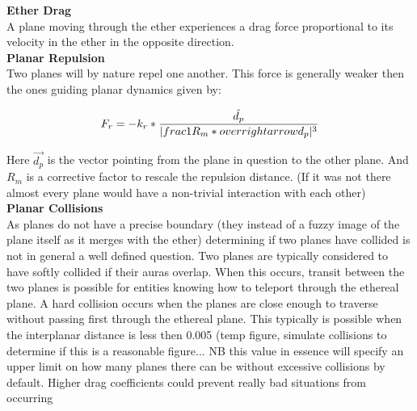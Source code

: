\documentclass[10pt]{article}
\begin{document}
\noindent\textbf{Ether Drag}\\
A plane moving through the ether experiences a drag force proportional to its velocity in the ether in the opposite direction.\\

\noindent\textbf{Planar Repulsion}\\
Two planes will by nature repel one another. This force is generally weaker then the ones guiding planar dynamics given by:

\[
F_r = -k_r*\frac{\hat{d_p}}{\vert\\frac{1}{R_m}*overrightarrow{d_p}\vert^3}
\]

Here $\overrightarrow{d_p}$ is the vector pointing from the plane in question to the other plane. And $R_m$ is a corrective factor to rescale the repulsion distance. (If it was not there almost every plane would have a non-trivial interaction with each other)\\

\noindent\textbf{Planar Collisions}\\
As planes do not have a precise boundary (they instead of a fuzzy image of the plane itself as it merges with the ether) determining if two planes have collided is not in general a well defined question. Two planes are typically considered to have softly collided if their auras overlap. When this occurs, transit between the two planes is possible for entities knowing how to teleport through the ethereal plane. A hard collision occurs when the planes are close enough to traverse without passing first through the ethereal plane. This typically is possible when the interplanar distance is less then 0.005 (temp figure, simulate collisions to determine if this is a reasonable figure... NB this value in essence will specify an upper limit on how many planes there can be without excessive collisions by default. Higher drag coefficients could prevent really bad situations from occurring
\end{document}
